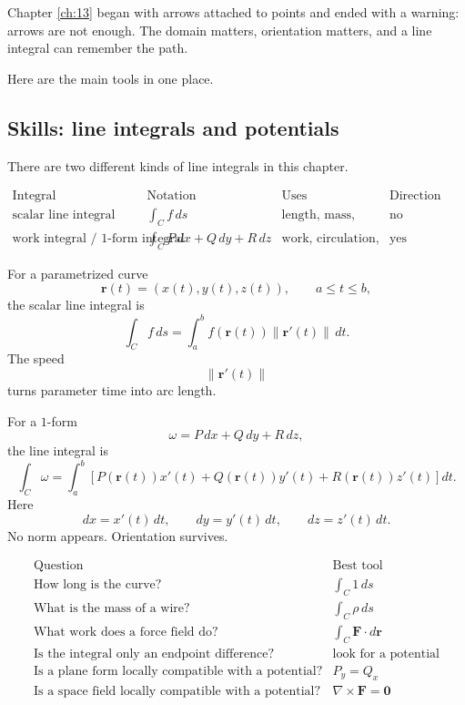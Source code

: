Chapter \ref{ch:13} began with arrows attached to points and ended with a warning:
arrows are not enough.  The domain matters, orientation matters, and a line integral
can remember the path.

Here are the main tools in one place.

\subsection{Skills: line integrals and potentials}

There are two different kinds of line integrals in this chapter.

\[
\begin{array}{c|c|c|c}
\text{Integral} & \text{Notation} & \text{Uses} & \text{Direction matters?} \\ \hline
\text{scalar line integral}
&
\displaystyle \int_C f\,ds
&
\text{length, mass, average value}
&
\text{no}
\\[3mm]
\text{work integral / \(1\)-form integral}
&
\displaystyle \int_C P\,dx+Q\,dy+R\,dz
&
\text{work, circulation, potentials}
&
\text{yes}
\end{array}
\]

For a parametrized curve
\[
    \mathbf r(t)=(x(t),y(t),z(t)),
    \qquad a\le t\le b,
\]
the scalar line integral is
\[
\boxed{
    \int_C f\,ds
    =
    \int_a^b f(\mathbf r(t))\|\mathbf r'(t)\|\,dt.
}
\]
The speed
\[
    \|\mathbf r'(t)\|
\]
turns parameter time into arc length.

For a \(1\)-form
\[
    \omega=P\,dx+Q\,dy+R\,dz,
\]
the line integral is
\[
\boxed{
    \int_C \omega
    =
    \int_a^b
    \left[
        P(\mathbf r(t))x'(t)
        +
        Q(\mathbf r(t))y'(t)
        +
        R(\mathbf r(t))z'(t)
    \right]dt.
}
\]
Here
\[
    dx=x'(t)\,dt,\qquad dy=y'(t)\,dt,\qquad dz=z'(t)\,dt.
\]
No norm appears.  Orientation survives.

\[
\begin{array}{c|c}
\text{Question} & \text{Best tool} \\ \hline
\text{How long is the curve?} & \displaystyle \int_C 1\,ds\\[2mm]
\text{What is the mass of a wire?} & \displaystyle \int_C \rho\,ds\\[2mm]
\text{What work does a force field do?} & \displaystyle \int_C \mathbf F\cdot d\mathbf r\\[2mm]
\text{Is the integral only an endpoint difference?} & \text{look for a potential}\\[1mm]
\text{Is a plane form locally compatible with a potential?} & P_y=Q_x\\[1mm]
\text{Is a space field locally compatible with a potential?} & \nabla\times\mathbf F=\mathbf 0
\end{array}
\]

